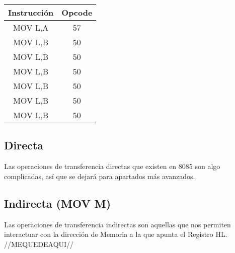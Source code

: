 \documentclass[12pt]{article}
\begin{document}
	\begin{table}[h!]
		\flushleft
		\hspace{0.3cm}
		\label{tab:MOV3}
		\begin{tabular}{c|c}
			Instrucción & Opcode \\
			\midrule
			MOV L,A & 57 \\
			MOV L,B & 50 \\
			MOV L,B & 50 \\
			MOV L,B & 50 \\
			MOV L,B & 50 \\
			MOV L,B & 50 \\
			MOV L,B & 50 \\
		\end{tabular}
	\end{table}
	
	\subsection {Directa}
	
	Las operaciones de transferencia directas que existen en 8085 son algo complicadas, así que se dejará para apartados más avanzados.\\
	
		\subsection {Indirecta (MOV M)}
	
	Las operaciones de transferencia indirectas son aquellas que nos permiten interactuar con la dirección de Memoria a la que apunta el Registro HL.\\
	
	//MEQUEDEAQUI//
	
\end{document}
